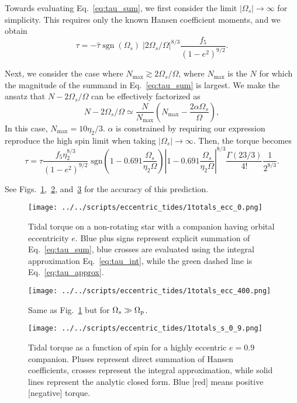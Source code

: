 \documentclass[
        fleqn,
        usenatbib,
        referee,
    ]{mnras}
\newcommand*{\abs}[1]{\left|#1\right|}
\DeclareMathOperator*{\sgn}{sgn}
\begin{document}
Towards evaluating Eq.~\eqref{eq:tau_sum}, we first consider the limit
$\abs{\Omega_s} \to \infty$ for simplicity. This requires only the known Hansen
coefficient moments, and we obtain
\begin{equation}
    \tau = -\hat{\tau} \sgn (\Omega_s)\;\left|2 \Omega_s /
        \Omega\right|^{8/3} \frac{f_5}{(1 - e^2)^{9/2}}.
\end{equation}

Next, we consider the case where $N_{\max} \gtrsim 2\Omega_s/\Omega$, where
$N_{\max}$ is the $N$ for which the magnitude of the summand in
Eq.~\eqref{eq:tau_sum} is largest. We make the ansatz that $N -
2\Omega_s/\Omega$ can be effectively factorized as
\begin{equation}
    N - 2\Omega_s / \Omega \simeq \frac{N}{N_{\max}}
        \left(N_{\max} - \frac{2\alpha \Omega_s}{\Omega}\right),
\end{equation}
In this case, $N_{\max} = 10\eta_2 / 3$. $\alpha$ is constrained by requiring
our expression reproduce the high spin limit when taking $\abs{\Omega_s} \to
\infty$. Then, the torque becomes
\begin{equation}
    \tau = \hat{\tau} \frac{f_5 \eta_2^{8/3}}{(1 - e^2)^{9/2}}
        \;\mathrm{sgn}\left(1 - 0.691\frac{\Omega_s}{\eta_2\Omega}\right)
            \left|1 - 0.691\frac{\Omega_s}{\eta_2\Omega}\right|^{8/3}
            \frac{\Gamma(23/3)}{4!} \frac{1}{2^{8/3}}.\label{eq:tau_approx}
\end{equation}

See Figs.~\ref{fig:totals_ecc0},~\ref{fig:totals_ecc400},
and~\ref{fig:totals_s} for the accuracy of this prediction.
\begin{figure}
    \centering
    \texttt{[image: ../../scripts/eccentric\_tides/1totals\_ecc\_0.png]}
    \caption{Tidal torque on a non-rotating star with a companion having
    orbital eccentricity $e$. Blue plus signs represent explicit summation of
    Eq.~\eqref{eq:tau_sum}, blue crosses are evaluated using the integral
    approximation Eq.~\eqref{eq:tau_int}, while the green dashed line is
    Eq.~\eqref{eq:tau_approx}.}\label{fig:totals_ecc0}
\end{figure}
\begin{figure}
    \centering
    \texttt{[image: ../../scripts/eccentric\_tides/1totals\_ecc\_400.png]}
    \caption{Same as Fig.~\ref{fig:totals_ecc0} but for $\Omega_{s} \gg
    \Omega_{\rm p}$.}\label{fig:totals_ecc400}
\end{figure}
\begin{figure}
    \centering
    \texttt{[image: ../../scripts/eccentric\_tides/1totals\_s\_0\_9.png]}
    \caption{Tidal torque as a function of spin for a highly eccentric $e = 0.9$
    companion. Pluses represent direct summation of Hansen coefficients, crosses
    represent the integral approximation, while solid lines represent the
    analytic closed form. Blue [red] means positive [negative]
    torque.}\label{fig:totals_s}
\end{figure}
\end{document}
